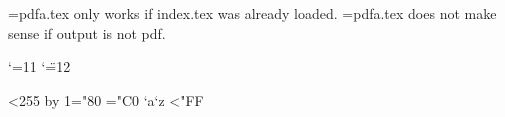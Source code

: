 
\let\next=\endinput
\ifx\pdfoutput\undefined
 \errhelp={pdfa.tex only works if index.tex was already loaded.}
\else
 \ifcase\pdfoutput
  \errhelp={pdfa.tex does not make sense if output is not pdf.}
 \else
  \let\next=\relax
 \fi
\fi
\next


\edef\atcatcode{\the\catcode`\@}
\edef\quotecatcode{\the\catcode`\"}
\catcode`\@=11
\catcode`\"=12
\def\@gobble#1{}

\def\hash{\expandafter\@gobble\string\#}
\def\amp{\expandafter\@gobble\string\&}
\def\xmpAmp{\amp\hash x0026;}
\def\sep{</rdf:li><rdf:li>}
\def\TextCopyright{\amp\hash x00A9;}

\def\dountil#1\continue{\def\body{#1}\reiterate}
\def\reiterate{\body \let\next\relax \else \let\next\reiterate \fi \next}
\let\continue=\fi

\def\allhighother{\count@=128
 \loop \catcode\count@=12 \ifnum\count@<255 \advance\count@ by 1\repeat}

{\allhighother \count@="80 \count@@="C0
 \loop \lccode`a\count@ \lccode`z\count@@
 \lowercase{\expandafter\xdef\csname a}%
 \ifnum\count@@<"FF \advance{} \advance{} \repeat
}

\def\@utf{\allhighother \catcode`\^^c2=13 \catcode`\^^c3=0 }

